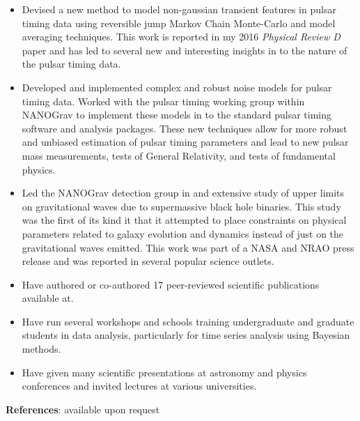 \documentclass[11pt,letterpaper,sans]{moderncv} %
\begin{document}
\begin{itemize}

\item Devised a new method to model non-gaussian transient features in pulsar timing data using reversible jump Markov Chain Monte-Carlo and model averaging techniques. This work is reported in my 2016 \emph{Physical Review D} paper and has led to several new and interesting insights in to the nature of the pulsar timing data.
\vspace{6pt}

\item Developed and implemented complex and robust noise models for pulsar timing data. Worked with the pulsar timing working group within NANOGrav to implement these models in to the standard pulsar timing software and analysis packages. These new techniques allow for more robust and unbiased estimation of pulsar timing parameters and lead to new pulsar mass measurements, tests of General Relativity, and tests of fundamental physics.
\vspace{6pt}

\item Led the NANOGrav detection group in and extensive study of upper limits on gravitational waves due to supermassive black hole binaries. This study was the first of its kind it that it attempted to place constraints on physical parameters related to galaxy evolution and dynamics instead of just on the gravitational waves emitted. This work was part of a NASA and NRAO press release and was reported in several popular science outlets.
\vspace{6pt}

\item Have authored or co-authored 17 peer-reviewed scientific publications available at.
\vspace{6pt}

\item Have run several workshops and schools training undergraduate and graduate students in data analysis, particularly for time series analysis using Bayesian methods.
\vspace{6pt}

\item Have given many scientific presentations at astronomy and physics conferences and invited lectures at various universities. 

\end{itemize}

\vspace{15pt}
{\Large\textbf{References}:} available upon request
\end{document}
